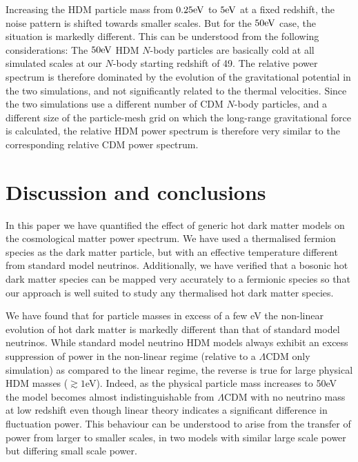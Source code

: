 \documentclass[11pt,a4paper]{article}
\renewcommand\({\left(}
\renewcommand\){\right)}
\renewcommand\[{\left[}
\renewcommand\]{\right]}
\begin{document}
Increasing the HDM particle mass from $0.25{\rm eV}$ to $5{\rm eV}$ at a fixed redshift, the noise pattern is shifted towards smaller scales. But for the $50{\rm eV}$ case, the situation is markedly different. This can be understood from the following considerations: The $50{\rm eV}$ HDM $N$-body particles are basically cold at all simulated scales at our $N$-body starting redshift of 49. The relative power spectrum is therefore dominated by the evolution of the gravitational potential in the two simulations, and not significantly related to the thermal velocities. Since the two simulations use a different number of CDM $N$-body particles, and a different size of the particle-mesh grid on which the long-range gravitational force is calculated, the relative HDM power spectrum is therefore very similar to the corresponding relative CDM power spectrum. 

\section{Discussion and conclusions}\label{sec:conclusions}
In this paper we have quantified the effect of generic hot dark matter models on the cosmological matter power spectrum. We have used a thermalised fermion species as the dark matter particle, but with an effective temperature different from standard model neutrinos.
Additionally, we have verified that a bosonic hot dark matter species can be mapped very accurately to a fermionic species so that our approach is well suited to study any thermalised hot dark matter species.

We have found that for particle masses in excess of a few eV the non-linear evolution of hot dark matter is markedly different than that of standard model neutrinos. While standard model neutrino HDM models always exhibit an excess suppression of power in the non-linear regime (relative to a $\Lambda$CDM only simulation) as compared to the linear regime, the reverse is true for large physical HDM masses ($\gtrsim 1$eV).
Indeed, as the physical particle mass increases to 50eV the model becomes almost indistinguishable from $\Lambda$CDM with no neutrino mass at low redshift even though linear theory indicates a significant difference in fluctuation power. This behaviour can be understood to arise from the transfer of power from larger to smaller scales, in two models with similar large scale power but differing small scale power.
\end{document}
